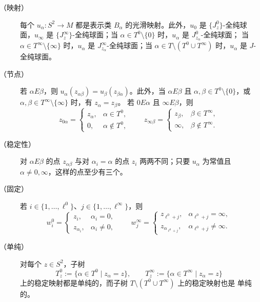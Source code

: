 \begin{description}
\item[（映射）]
每个 $u_\alpha:S^2\to M$ 都是表示类 $B_\alpha$ 的光滑映射。此外，$u_0$ 是
$\{J_z^0\}$-全纯球面，$u_\infty$ 是 $\{J_z^\infty\}$-全纯球面；当
$\alpha\in T^0\setminus\{0\}$ 时，$u_\alpha$ 是 $J_{z_\alpha}^0$-全纯球面；
当 $\alpha\in T^\infty\setminus\{\infty\}$ 时，$u_\alpha$ 是
$J_{z_\alpha}^\infty$-全纯球面；当
$\alpha\in T\setminus(T^0\cup T^\infty)$ 时，$u_\alpha$ 是 $J$-全纯球面。

\item[（节点）]
若 $\alpha E\beta$，则
$u_\alpha(z_{\alpha\beta})=u_\beta(z_{\beta\alpha})$。此外，当
$\alpha E\beta$ 且 $\alpha,\beta\in T^0\setminus\{0\}$，或
$\alpha,\beta\in T^\infty\setminus\{\infty\}$ 时，有 $z_\alpha=z_\beta$。
若 $0E\alpha$ 且 $\infty E\beta$，则
\[
  z_{0\alpha}=\begin{cases}
    z_\alpha,&\alpha\in T^0,\\
    0,&\alpha\notin T^0,
  \end{cases}
  \qquad
  z_{\infty\beta}=\begin{cases}
    z_\beta,&\beta\in T^\infty,\\
    \infty,&\beta\notin T^\infty.
  \end{cases}
\]

\item[（稳定性）]
对 $\alpha E\beta$ 的点 $z_{\alpha\beta}$ 与对 $\alpha_i=\alpha$ 的点 $z_i$
两两不同；只要 $u_\alpha$ 为常值且 $\alpha\ne0,\infty$，这样的点至少有三个。

\item[（固定）]
若 $i\in\{1,\ldots,\ell^0\}$、$j\in\{1,\ldots,\ell^\infty\}$，则
\[
  w_i^0=\begin{cases}
    z_i,&\alpha_i=0,\\
    z_{\alpha_i},&\alpha_i\ne0,
  \end{cases}
  \qquad
  w_j^\infty=\begin{cases}
    z_{\ell^0+j},&\alpha_{\ell^0+j}=\infty,\\
    z_{\alpha_{\ell^0+j}},&\alpha_{\ell^0+j}\ne\infty.
  \end{cases}
\]

\item[（单纯）]
对每个 $z\in S^2$，子树
\[
  T_z^0:=\{\alpha\in T^0\mid z_\alpha=z\},
  \qquad
  T_z^\infty:=\{\alpha\in T^\infty\mid z_\alpha=z\}
\]
上的稳定映射都是单纯的，而子树 $T\setminus(T^0\cup T^\infty)$ 上的稳定映射也是
单纯的。
\end{description}

